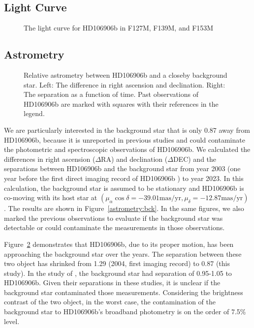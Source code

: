 \documentclass[modern]{aastex62}
\begin{document}
\subsection{Light Curve}
\begin{figure}
  \centering
  \caption{The light curve for HD106906b in F127M, F139M, and F153M}
  \label{fig:lightcurve}
\end{figure}

\subsection{Astrometry}


\begin{figure}
  \centering
  \caption{Relative astrometry between HD106906b and a closeby background star. Left: The difference in right ascension and declination. Right: The separation as a function of time. Past observations of HD106906b are marked with squares with their references in the legend.}
  \label{fig:astrometry:bck}
\end{figure}
We are particularly interested in the background star that is only 0\arcsec{}.87 away from HD106906b, because it is unreported in previous studies and could contaminate the photometric and spectroscopic observations of HD106906b. We calculated the differences in right ascension ($\Delta$RA) and declination ($\Delta$DEC) and the separations between HD106906b and the background star from year 2003 (one year before the first direct imaging record of HD106906b ) to year 2023. In this calculation, the background star is assumed to be stationary and HD106906b is co-moving with its host star at $(\mu_\alpha\cos\delta=-39.01 \mbox{mas/yr}, \mu_{\delta}=-12.87 \mbox{mas/yr})$ \citep{Gaia2016, Gaia2018}. The results are shown in Figure~\ref{astrometry:bck}. In the same figures, we also marked the previous observations \citep{Bailey2013, Wu2016, Lagrange2016, Daemgen2017} to evaluate if the background star was detectable or could contaminate the measurements in those observations.

Figure~\ref{fig:astrometry:bck} demonstrates that HD106906b, due to its proper motion, has been approaching  the background star over the years. The separation between these two object has shrinked from 1\arcsec.29 (2004, first imaging record) to 0\arcsec.87 (this study). In the study of \citep{Bailey2013, Wu2016, Daemgen2017}, the background star had separation of 0.95-1.05 to HD106906b. Given their separations in these studies, it is unclear if the background star contaminated those measurements. Considering the brightness contrast of the two object, in the worst case, the contamination of the background star to HD106906b's broadband photometry is on the order of 7.5\% level.
\end{document}
